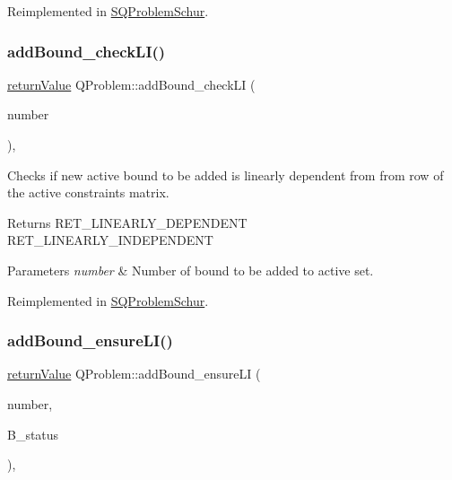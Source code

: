 Reimplemented in \hyperlink{class_s_q_problem_schur_a9a06eeb8e518946742202e927b3fdd7b}{S\+Q\+Problem\+Schur}.

\mbox{\label{class_q_problem_a7ffc401c784522506e76db1c5e4ea305}} 
\subsubsection{\texorpdfstring{add\+Bound\+\_\+check\+L\+I()}{addBound\_checkLI()}}
{\footnotesize\ttfamily \hyperlink{_message_handling_8hpp_a81d556f613bfbabd0b1f9488c0fa865e}{return\+Value} Q\+Problem\+::add\+Bound\+\_\+check\+LI (\begin{DoxyParamCaption}\item[{\hyperlink{_types_8hpp_ab6fd6105e64ed14a0c9281326f05e623}{int\+\_\+t}}]{number }\end{DoxyParamCaption})\hspace{0.3cm}{\ttfamily [protected]}, {\ttfamily [virtual]}}

Checks if new active bound to be added is linearly dependent from from row of the active constraints matrix. \begin{DoxyReturn}{Returns}
R\+E\+T\+\_\+\+L\+I\+N\+E\+A\+R\+L\+Y\+\_\+\+D\+E\+P\+E\+N\+D\+E\+NT ~\newline
 R\+E\+T\+\_\+\+L\+I\+N\+E\+A\+R\+L\+Y\+\_\+\+I\+N\+D\+E\+P\+E\+N\+D\+E\+NT 
\end{DoxyReturn}

\begin{DoxyParams}{Parameters}
{\em number} & Number of bound to be added to active set. \\
\hline
\end{DoxyParams}


Reimplemented in \hyperlink{class_s_q_problem_schur_af60b7a8cfc76b04bb1541df32cc99272}{S\+Q\+Problem\+Schur}.

\mbox{\label{class_q_problem_a5b2284588df5e8d4b8c8d619d8d26c47}} 
\subsubsection{\texorpdfstring{add\+Bound\+\_\+ensure\+L\+I()}{addBound\_ensureLI()}}
{\footnotesize\ttfamily \hyperlink{_message_handling_8hpp_a81d556f613bfbabd0b1f9488c0fa865e}{return\+Value} Q\+Problem\+::add\+Bound\+\_\+ensure\+LI (\begin{DoxyParamCaption}\item[{\hyperlink{_types_8hpp_ab6fd6105e64ed14a0c9281326f05e623}{int\+\_\+t}}]{number,  }\item[{\hyperlink{_types_8hpp_a70a6a40d261a015ead8d43aa589383a4}{Subject\+To\+Status}}]{B\+\_\+status }\end{DoxyParamCaption})\hspace{0.3cm}{\ttfamily [protected]}, {\ttfamily [virtual]}}


